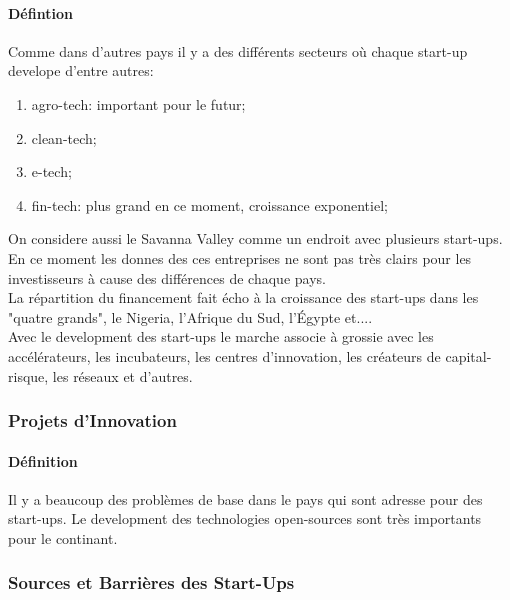 \documentclass{article}
\begin{document}
\paragraph{Défintion}Comme dans d'autres pays il y a des différents secteurs où chaque start-up develope d'entre autres:
\begin{enumerate}[noitemsep]
    \item agro-tech: important pour le futur;
    \item clean-tech;
    \item e-tech;
    \item fin-tech: plus grand en ce moment, croissance exponentiel;
\end{enumerate}
\noindent On considere aussi le Savanna Valley comme un endroit avec plusieurs start-ups. En ce moment les donnes des ces entreprises ne sont pas très clairs pour les investisseurs à cause des différences de chaque pays.\\

\noindent La répartition du financement fait écho à la croissance des start-ups dans les "quatre grands", le Nigeria, l'Afrique du Sud, l'Égypte et....\\

\noindent Avec le development des start-ups le marche associe à grossie avec les  accélérateurs, les incubateurs, les centres d'innovation, les créateurs de capital-risque, les réseaux et d'autres.\\

\subsubsection{Projets d'Innovation}
\paragraph{Définition}Il y a beaucoup des problèmes de base dans le pays qui sont adresse pour des start-ups. Le development des technologies open-sources sont très importants pour le continant.

\subsubsection{Sources et Barrières des Start-Ups}
\end{document}
